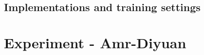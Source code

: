 \documentclass{article}
\begin{document}
	
	
	\subsection{Implementations and training settings}
	
	
	
	
	
	
	
	
	
	
	
	
	
	
	
	
	\section{Experiment - Amr-Diyuan}
	
\end{document}

